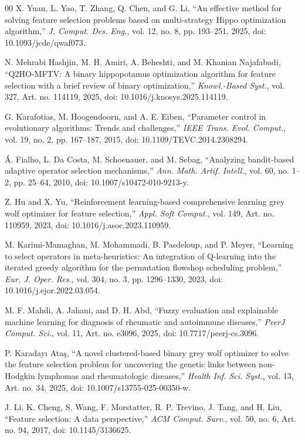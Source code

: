 \documentclass[journal]{IEEEtran}
\begin{document}
\begin{thebibliography}{00}
 X. Yuan, L. Yao, T. Zhang, Q. Chen, and G. Li, ``An effective method for solving feature selection problems based on multi-strategy Hippo optimization algorithm,'' \textit{J. Comput. Des. Eng.}, vol. 12, no. 8, pp. 193--251, 2025, doi: 10.1093/jcde/qwaf073.

 N. Mehrabi Hashjin, M. H. Amiri, A. Beheshti, and M. Khanian Najafabadi, ``Q2HO-MFTV: A binary hippopotamus optimization algorithm for feature selection with a brief review of binary optimization,'' \textit{Knowl.-Based Syst.}, vol. 327, Art. no. 114119, 2025, doi: 10.1016/j.knosys.2025.114119.

 G. Karafotias, M. Hoogendoorn, and A. E. Eiben, ``Parameter control in evolutionary algorithms: Trends and challenges,'' \textit{IEEE Trans. Evol. Comput.}, vol. 19, no. 2, pp. 167--187, 2015, doi: 10.1109/TEVC.2014.2308294.

 \'A. Fialho, L. Da Costa, M. Schoenauer, and M. Sebag, ``Analyzing bandit-based adaptive operator selection mechanisms,'' \textit{Ann. Math. Artif. Intell.}, vol. 60, no. 1--2, pp. 25--64, 2010, doi: 10.1007/s10472-010-9213-y.

 Z. Hu and X. Yu, ``Reinforcement learning-based comprehensive learning grey wolf optimizer for feature selection,'' \textit{Appl. Soft Comput.}, vol. 149, Art. no. 110959, 2023, doi: 10.1016/j.asoc.2023.110959.

 M. Karimi-Mamaghan, M. Mohammadi, B. Pasdeloup, and P. Meyer, ``Learning to select operators in meta-heuristics: An integration of Q-learning into the iterated greedy algorithm for the permutation flowshop scheduling problem,'' \textit{Eur. J. Oper. Res.}, vol. 304, no. 3, pp. 1296--1330, 2023, doi: 10.1016/j.ejor.2022.03.054.

 M. F. Mahdi, A. Jahani, and D. H. Abd, ``Fuzzy evaluation and explainable machine learning for diagnosis of rheumatic and autoimmune diseases,'' \textit{PeerJ Comput. Sci.}, vol. 11, Art. no. e3096, 2025, doi: 10.7717/peerj-cs.3096.

 P. Karaday{\i} Ata\c{s}, ``A novel clustered-based binary grey wolf optimizer to solve the feature selection problem for uncovering the genetic links between non-Hodgkin lymphomas and rheumatologic diseases,'' \textit{Health Inf. Sci. Syst.}, vol. 13, Art. no. 34, 2025, doi: 10.1007/s13755-025-00350-w.

 J. Li, K. Cheng, S. Wang, F. Morstatter, R. P. Trevino, J. Tang, and H. Liu, ``Feature selection: A data perspective,'' \textit{ACM Comput. Surv.}, vol. 50, no. 6, Art. no. 94, 2017, doi: 10.1145/3136625.


\end{thebibliography}
\end{document}
